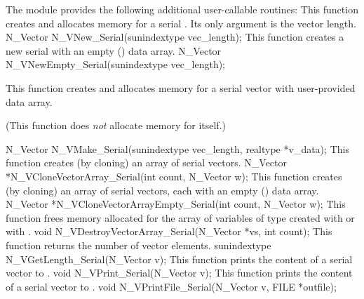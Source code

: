 The module {\nvecs} provides the following additional user-callable routines:
{
  This function creates and allocates memory for a serial .
  Its only argument is the vector length.
}
{
  N\_Vector N\_VNew\_Serial(sunindextype vec\_length);
}
{
  This function creates a new serial  with an empty ()
  data array.
}
{
  N\_Vector N\_VNewEmpty\_Serial(sunindextype vec\_length);
}
{
  This function creates and allocates memory for a serial vector
  with user-provided data array.

  (This function does {\em not} allocate memory for  itself.)
}
{
  N\_Vector N\_VMake\_Serial(sunindextype vec\_length, realtype *v\_data);
}
{
  This function creates (by cloning) an array of  serial vectors.
}
{
  N\_Vector *N\_VCloneVectorArray\_Serial(int count, N\_Vector w);
}
{
  This function creates (by cloning) an array of  serial vectors,
  each with an empty () data array.
}
{
  N\_Vector *N\_VCloneVectorArrayEmpty\_Serial(int count, N\_Vector w);
}
{
  This function frees memory allocated for the array of  variables of type
   created with  or with \newline
  .
}
{
  void N\_VDestroyVectorArray\_Serial(N\_Vector *vs, int count);
}
{
  This function returns the number of vector elements.
}
{
  sunindextype N\_VGetLength\_Serial(N\_Vector v);
}
{
  This function prints the content of a serial vector to .
}
{
  void N\_VPrint\_Serial(N\_Vector v);
}
{
  This function prints the content of a serial vector to .
}
{
  void N\_VPrintFile\_Serial(N\_Vector v, FILE *outfile);
}

